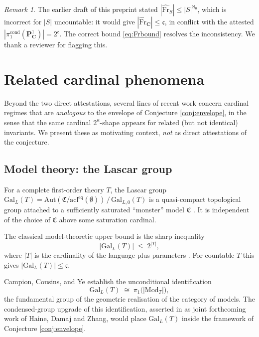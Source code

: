 \documentclass[11pt]{article}
\theoremstyle{definition}
\theoremstyle{plain}
\theoremstyle{remark}
\newtheorem*{remark}{Remark}
\newcommand{\GalL}{\mathrm{Gal}_{L}}
\newcommand{\Frhat}{\widehat{\mathrm{Fr}}}
\newcommand{\Pone}{\mathbf{P}^{1}}
\newcommand{\C}{\mathbf{C}}
\newcommand{\continuum}{\mathfrak{c}}
\begin{document}
\begin{remark}
The earlier draft of this preprint stated $|\Frhat_S| \le |S|^{\aleph_0}$,
which is incorrect for $|S|$ uncountable: it would give $|\Frhat_{\C}| \le
\continuum$, in conflict with the attested
$|\pi_1^{\mathrm{cond}}(\Pone_{\C})| = 2^{\continuum}$. The correct bound
\eqref{eq:Frbound} resolves the inconsistency. We thank a reviewer for flagging
this.
\end{remark}

\section{Related cardinal phenomena}\label{sec:analogical}

Beyond the two direct attestations, several lines of recent work concern
cardinal regimes that are \emph{analogous} to the envelope of
Conjecture \ref{conj:envelope}, in the sense that the same cardinal
$2^{\kappa}$-shape appears for related (but not identical) invariants. We
present these as motivating context, \emph{not} as direct attestations of the
conjecture.

\subsection{Model theory: the Lascar group}\label{sec:modeltheory}

For a complete first-order theory $T$, the Lascar group
$\GalL(T) = \mathrm{Aut}(\mathfrak C / \mathrm{acl}^{\mathrm{eq}}(\emptyset))\,/\,\mathrm{Gal}_{L,0}(T)$
is a quasi-compact topological group attached to a sufficiently saturated
``monster'' model $\mathfrak C$ \cite[Ch.~6]{Casanovas2011}. It is independent
of the choice of $\mathfrak C$ above some saturation cardinal.

The classical model-theoretic upper bound is the sharp inequality
\begin{equation}\label{eq:lascar-bound}
|\GalL(T)| \;\le\; 2^{|T|},
\end{equation}
where $|T|$ is the cardinality of the language plus parameters
\cite[Theorem 1.4]{CampionCousinsYe2021}. For countable $T$ this gives
$|\GalL(T)| \le \continuum$.

Campion, Cousins, and Ye \cite{CampionCousinsYe2021} establish the
unconditional identification
\begin{equation}
\GalL(T) \;\cong\; \pi_1\bigl(|\mathrm{Mod}_T|\bigr),
\end{equation}
the fundamental group of the geometric realisation of the category of
models. The condensed-group upgrade of this identification, asserted in
\cite[\S 0]{Haine2026classifying} as joint forthcoming work of Haine, Damaj
and Zhang, would place $\GalL(T)$ inside the framework of
Conjecture \ref{conj:envelope}.
\end{document}

